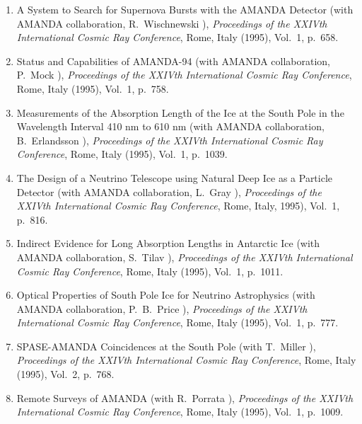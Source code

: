 \begin{enumerate}
\item    A System to Search for Supernova Bursts with the AMANDA 
         Detector 
         (with AMANDA collaboration, R.~Wischnewski
         \etal), 
         {\it Proceedings of the 
         XXIVth International Cosmic Ray Conference},
         Rome, Italy (1995), Vol.~1, p.~658.

\item    Status and Capabilities of AMANDA-94
         (with AMANDA collaboration, P.~Mock
         \etal), 
         {\it Proceedings of the
         XXIVth International Cosmic Ray Conference},
         Rome, Italy (1995), Vol.~1, p.~758.

\item    Measurements of the Absorption Length of the Ice at the South
         Pole in the Wavelength Interval 410 nm to 610 nm
         (with AMANDA collaboration, B.~Erlandsson
         \etal), 
	 {\it Proceedings of the 
         XXIVth International Cosmic Ray Conference},
         Rome, Italy (1995), Vol.~1, p.~1039.

\item    The Design of a Neutrino Telescope using Natural Deep Ice
         as a Particle Detector (with AMANDA collaboration, L.~Gray
         \etal), 
         {\it Proceedings of the 
         XXIVth International Cosmic Ray Conference},
         Rome, Italy, 1995), Vol.~1, p.~816.

\item    Indirect Evidence for Long Absorption Lengths in Antarctic 
         Ice (with AMANDA collaboration, S.~Tilav
         \etal), 
         {\it Proceedings of the 
         XXIVth International Cosmic Ray Conference},
         Rome, Italy (1995), Vol.~1, p.~1011.

\item    Optical Properties of South Pole Ice for Neutrino Astrophysics
         (with AMANDA collaboration, P.~B.~Price
         \etal), 
	 {\it Proceedings of the 
         XXIVth International Cosmic Ray Conference},
         Rome, Italy (1995), Vol.~1, p.~777.

\item    SPASE-AMANDA Coincidences at the South Pole (with T.~Miller 
         \etal), 
         {\it Proceedings of the 
         XXIVth International Cosmic Ray Conference},
         Rome, Italy (1995), Vol.~2, p.~768.

\item    Remote Surveys of AMANDA (with R.~Porrata \etal),
         {\it Proceedings of the 
         XXIVth International Cosmic Ray Conference},
         Rome, Italy (1995), Vol.~1, p.~1009.


\end{enumerate}
